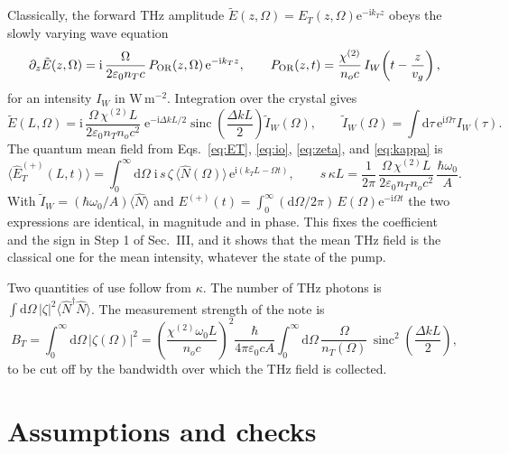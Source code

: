 \documentclass[aps,pra,onecolumn,notitlepage,11pt,amsmath,amssymb,nofootinbib]{revtex4-2}
\newcommand{\Nop}{\hat N}
\newcommand{\dd}{\mathrm{d}}
\newcommand{\ee}{\mathrm{e}}
\newcommand{\ii}{\mathrm{i}}
\newcommand{\sinc}{\operatorname{sinc}}
\begin{document}
Classically, the forward THz amplitude
$\tilde E(z,\Omega)=E_T(z,\Omega)\ee^{-\ii k_Tz}$ obeys the slowly varying
wave equation
\begin{equation}
\partial_z\tilde E(z,\Omega)=\ii\,\frac{\Omega}{2\varepsilon_0n_Tc}\,
P_{\rm OR}(z,\Omega)\,\ee^{-\ii k_Tz},\qquad
P_{\rm OR}(z,t)=\frac{\chi^{(2)}}{n_oc}\,I_W\!\left(t-\frac{z}{v_g}\right),
\end{equation}
for an intensity $I_W$ in $\mathrm{W\,m^{-2}}$. Integration over the crystal
gives
\begin{equation}
\tilde E(L,\Omega)=\ii\,\frac{\Omega\,\chi^{(2)}L}{2\varepsilon_0n_Tn_oc^2}\;
\ee^{-\ii\Delta kL/2}\sinc\!\left(\frac{\Delta kL}{2}\right)\tilde I_W(\Omega),
\qquad \tilde I_W(\Omega)=\int\!\dd\tau\,\ee^{\ii\Omega\tau}I_W(\tau).
\end{equation}
The quantum mean field from Eqs.~\eqref{eq:ET}, \eqref{eq:io},
\eqref{eq:zeta}, and \eqref{eq:kappa} is
\begin{equation}
\langle\hat E_T^{(+)}(L,t)\rangle=\int_0^\infty\!\!\dd\Omega\;
\ii\,s\,\zeta\,\langle\Nop(\Omega)\rangle\,\ee^{\ii(k_TL-\Omega t)},\qquad
s\,\kappa L=\frac{1}{2\pi}\,\frac{\Omega\,\chi^{(2)}L}{2\varepsilon_0n_Tn_oc^2}\,
\frac{\hbar\omega_0}{A}.
\end{equation}
With $\tilde I_W=(\hbar\omega_0/A)\langle\Nop\rangle$ and
$E^{(+)}(t)=\int_0^\infty(\dd\Omega/2\pi)\,E(\Omega)\ee^{-\ii\Omega t}$ the two
expressions are identical, in magnitude and in phase. This fixes the
coefficient and the sign in Step 1 of Sec.~III, and it shows that the mean
THz field is the classical one for the mean intensity, whatever the state of
the pump.

Two quantities of use follow from $\kappa$. The number of THz photons is
$\int\dd\Omega\,|\zeta|^2\langle\Nop^\dagger\Nop\rangle$. The measurement
strength of the note is
\begin{equation}
B_T=\int_0^\infty\!\!\dd\Omega\,|\zeta(\Omega)|^2
=\left(\frac{\chi^{(2)}\omega_0L}{n_oc}\right)^{\!2}\frac{\hbar}{4\pi\varepsilon_0cA}
\int_0^\infty\!\!\dd\Omega\,\frac{\Omega}{n_T(\Omega)}\,
\sinc^2\!\left(\frac{\Delta kL}{2}\right),
\end{equation}
to be cut off by the bandwidth over which the THz field is collected.

\section{Assumptions and checks}
\label{sec:checks}
\end{document}
